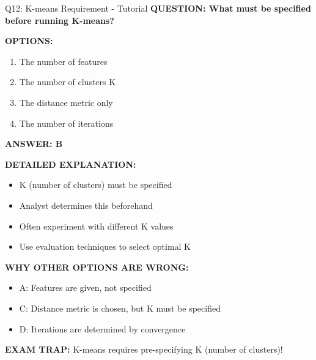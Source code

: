 \documentclass[8pt]{beamer}
\begin{document}
	\begin{frame}{Q12: K-means Requirement - Tutorial}
		\fontsize{6.5}{7.5}\selectfont
		\textbf{QUESTION: What must be specified before running K-means?}
		
		\vspace{0.1cm}
		\textbf{OPTIONS:}
		\begin{enumerate}
			\item The number of features
			\item The number of clusters K
			\item The distance metric only
			\item The number of iterations
		\end{enumerate}
		
		\vspace{0.1cm}
		\textcolor{myblue}{\textbf{ANSWER: B}}
		
		\vspace{0.1cm}
		\textbf{DETAILED EXPLANATION:}
		\begin{itemize}
			\item K (number of clusters) must be specified
			\item Analyst determines this beforehand
			\item Often experiment with different K values
			\item Use evaluation techniques to select optimal K
		\end{itemize}
		
		\vspace{0.1cm}
		\textcolor{myred}{\textbf{WHY OTHER OPTIONS ARE WRONG:}}
		\begin{itemize}
			\item \textcolor{myred}{A:} Features are given, not specified
			\item \textcolor{myred}{C:} Distance metric is chosen, but K must be specified
			\item \textcolor{myred}{D:} Iterations are determined by convergence
		\end{itemize}
		
		\textcolor{myred}{\textbf{EXAM TRAP:}} K-means requires \textcolor{myblue}{pre-specifying K} (number of clusters)!
	\end{frame}
	
\end{document}
